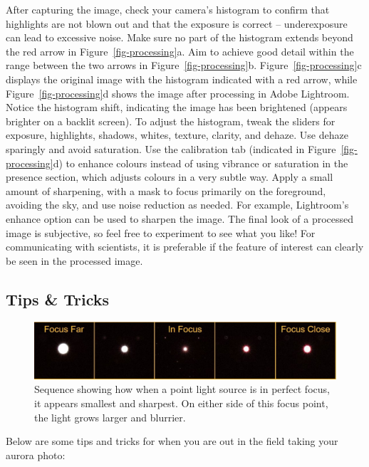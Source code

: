 \documentclass{article}
\begin{document}
After capturing the image, check your camera's histogram to confirm that highlights are not blown out and that the exposure is correct -- underexposure can lead to excessive noise. Make sure no part of the histogram extends beyond the red arrow in Figure~\ref{fig-processing}a. Aim to achieve good detail within the range between the two arrows in Figure~\ref{fig-processing}b. Figure~\ref{fig-processing}c displays the original image with the histogram indicated with a red arrow, while Figure~\ref{fig-processing}d shows the image after processing in Adobe Lightroom. Notice the histogram shift, indicating the image has been brightened (appears brighter on a backlit screen). To adjust the histogram, tweak the sliders for exposure, highlights, shadows, whites, texture, clarity, and dehaze. Use dehaze sparingly and avoid saturation. Use the calibration tab (indicated in Figure~\ref{fig-processing}d) to enhance colours instead of using vibrance or saturation in the presence section, which adjusts colours in a very subtle way. Apply a small amount of sharpening, with a mask to focus primarily on the foreground, avoiding the sky, and use noise reduction as needed. For example, Lightroom’s enhance option can be used to sharpen the image. The final look of a processed image is subjective, so feel free to experiment to see what you like! For communicating with scientists, it is preferable if the feature of interest can clearly be seen in the processed image. 



\subsection{Tips \& Tricks}


\begin{figure}
  \includegraphics[width=\linewidth]{Fig15_focusing.jpg}
  \caption{Sequence showing how when a point light source is in perfect focus, it appears smallest and sharpest. On either side of this focus point, the light grows larger and blurrier.}
  \label{fig-Focusing}
\end{figure}



Below are some tips and tricks for when you are out in the field taking your aurora photo:
\end{document}
